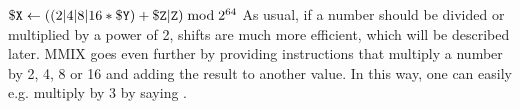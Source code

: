 \medskip

\instrtbl
	{}
	{${\tt \$X} \leftarrow ((2|4|8|16 * {\tt \$Y}) + {\tt \$Z}{\tt|Z}) \bmod 2^{64}$}
\noindent As usual, if a number should be divided or multiplied by a power of 2, shifts are much more efficient, which will be described later. MMIX goes even further by providing instructions that multiply a number by 2, 4, 8 or 16 and adding the result to another value. In this way, one can easily e.g. multiply by 3 by saying . \citep[pg. 6]{mmix-doc}

